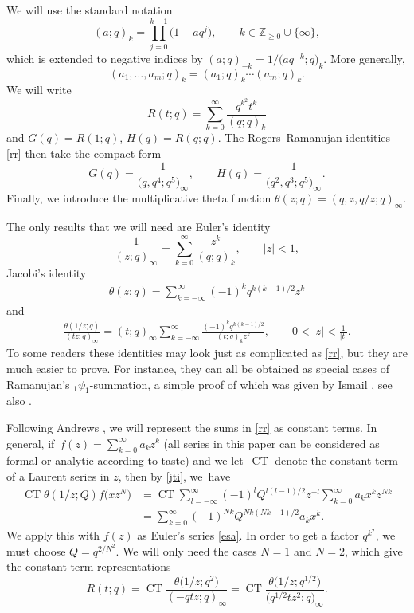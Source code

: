 \documentclass[11pt]{article}
\numberwithin{equation}{section}
\numberwithin{equation}{section}
\newcommand{\ct}{\operatorname{CT}}
\begin{document}
We will use the standard notation
\begin{equation*}
(a;q)_k=\prod_{j=0}^{k-1}\bigl(1-aq^j\bigr),\qquad k\in\mathbb Z_{\geq 0}\cup\{\infty\}, \end{equation*}
which is extended to negative indices by $(a;q)_{-k}=1/\bigl(aq^{-k};q\bigr)_k$. More generally,
\begin{equation*}(a_1,\dots,a_m;q)_k=(a_1;q)_k\dotsm (a_m;q)_k. \end{equation*}
We will write
\begin{equation*}R(t;q)=\sum_{k=0}^\infty\frac{q^{k^2}t^k}{(q;q)_k} \end{equation*}
and $G(q)=R(1;q)$, $H(q)=R(q;q)$.
The Rogers--Ramanujan identities \eqref{rr} then take the compact form
\[%
G(q)=\frac 1{\bigl(q,q^4;q^5\bigr)_\infty},\qquad H(q)=\frac 1{\bigl(q^2,q^3;q^5\bigr)_\infty}.
\]
Finally, we introduce the multiplicative theta function $\theta(z;q)=(q,z,q/z;q)_\infty$.

The only results that we will need are Euler's identity
\begin{equation}\label{esa}\frac 1{(z;q)_\infty}=\sum_{k=0}^\infty\frac{z^k}{(q;q)_k},\qquad |z|<1,\end{equation}
 Jacobi's identity
\begin{gather}\theta(z;q)=\sum_{k=-\infty}^\infty(-1)^kq^{k(k-1)/2}z^k \label{jti}
\end{gather}
and
\begin{gather}
\frac{\theta(1/z;q)}{(tz;q)_\infty}=(t;q)_\infty\sum_{k=-\infty}^{\infty}\frac{(-1)^kq^{k(k-1)/2}}{(t;q)_kz^k}, \qquad 0<|z|<\frac 1{|t|}.\label{rps}
\end{gather}
To some readers these identities may look just as complicated as \eqref{rr}, but they are much easier to prove. For instance, they can all be obtained as special cases of Ramanujan's ${}_1\psi_1$-summation, a simple proof of which was given by Ismail \cite{i}, see also \cite[Appendix~C]{a86}.


Following Andrews \cite{a86}, we will represent the sums in \eqref{rr} as constant terms. In general, if~${f(z)=\sum_{k=0}^\infty a_k z^k}$
 (all series in this paper can be considered as formal or analytic according to taste)
and we let~$\ct$ denote the constant term of a Laurent series in $z$, then by \eqref{jti}, we~have%
\begin{align}
\ct \theta(1/z;Q)f\bigl(xz^N\bigr)&=\ct \sum_{l=-\infty}^\infty (-1)^lQ^{l(l-1)/2}z^{-l}\sum_{k=0}^\infty a_k x^kz^{Nk}\nonumber\\
&=\sum_{k=0}^\infty
(-1)^{Nk}Q^{Nk(Nk-1)/2}a_k x^k.\label{fexp}
\end{align}
We apply this with $f(z)$ as Euler's series \eqref{esa}. In order to get a factor $q^{k^2}$, we must choose $Q=q^{2/N^2}$. We will only need the cases $N=1$ and $N=2$, which give the constant term representations
\begin{equation*}R(t;q)
=\ct\frac{\theta\bigl(1/z;q^{2}\bigr)}{ (-qtz;q)_\infty}
=\ct\frac{\theta\bigl(1/z;q^{1/2}\bigr)}{ \bigl(q^{1/2}tz^2;q\bigr)_\infty}.
\end{equation*}
\end{document}
